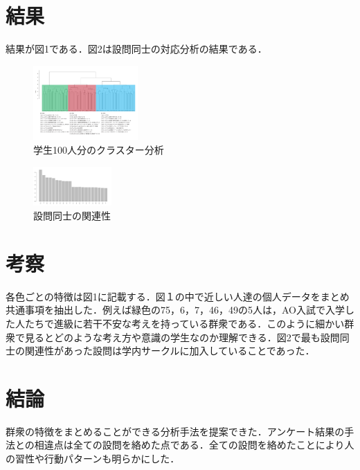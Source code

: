 \documentclass[uplatex,twocolumn,dvipdfmx]{jsarticle}
\begin{document}
\section{結果}
結果が図1である．図2は設問同士の対応分析の結果である．
\begin{figure}[h]
\centering
\includegraphics[width=4cm]{clusterresults.pdf}
\caption{学生100人分のクラスター分析}\label{学生100人分のクラスター分析}
\end{figure}
\begin{figure}[h]
\centering
\includegraphics[width=3cm]{correspondenceanalysishistogram.pdf}
\caption{設問同士の関連性}\label{設問同士の対応分析}
\end{figure}
\section{考察}
各色ごとの特徴は図1に記載する．図１の中で近しい人達の個人データをまとめ共通事項を抽出した．例えば緑色の75，6，7，46，49の5人は，AO入試で入学した人たちで進級に若干不安な考えを持っている群衆である．このように細かい群衆で見るとどのような考え方や意識の学生なのか理解できる．図2で最も設問同士の関連性があった設問は学内サークルに加入していることであった．
\section{結論}
群衆の特徴をまとめることができる分析手法を提案できた．アンケート結果の手法との相違点は全ての設問を絡めた点である．全ての設問を絡めたことにより人の習性や行動パターンも明らかにした．

\end{document}
